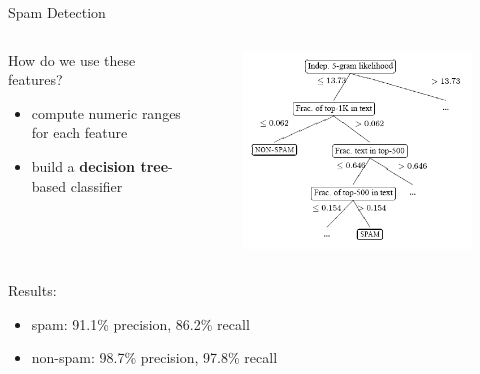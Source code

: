 \begin{frame}{Spam Detection}
\begin{columns}
	\begin{column}[r]{0.6\textwidth}
	How do we use these features?
	\begin{itemize}
	\item compute numeric ranges for each feature
	\item build a \textbf{decision tree}-based classifier
	\end{itemize}
	\end{column}

	\begin{column}[l]{0.5\textwidth}
		\begin{figure}
		\includegraphics[width=\textwidth]{img/dtree.png}
		\end{figure}
	\end{column}
\end{columns}

Results:
\begin{itemize}
	\item spam: 91.1\% precision, 86.2\% recall
	\item non-spam: 98.7\% precision, 97.8\% recall
\end{itemize}
\end{frame}
